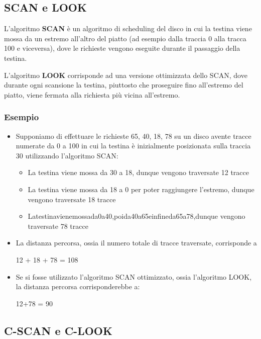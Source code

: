 \documentclass{article}
\begin{document}
\subsection{SCAN e LOOK}
L'algoritmo \textbf{SCAN} è un algoritmo di scheduling del disco in cui la testina viene mossa da un estremo all'altro del piatto (ad esempio dalla traccia 0 alla tracca 100 e viceversa), dove le richieste vengono eseguite durante il passaggio della testina.\par
L'algoritmo \textbf{LOOK} corrisponde ad una versione ottimizzata dello SCAN, dove durante ogni scansione la testina, piuttosto che proseguire fino all'estremo del piatto, viene fermata alla richiesta più vicina all'estremo.

\subsubsection{Esempio}
\begin{itemize}
    \item Supponiamo di effettuare le richieste 65, 40, 18, 78 su un disco avente tracce numerate da 0 a 100 in cui la testina è inizialmente posizionata sulla traccia 30 utilizzando l'algoritmo SCAN:
    \begin{itemize}
        \item La testina viene mossa da 30 a 18, dunque vengono traversate 12 tracce
        \item La testina viene mossa da 18 a 0 per poter raggiungere l'estremo, dunque
        vengono traversate 18 tracce
        \item Latestinavienemossada0a40,poida40a65einfineda65a78,dunque vengono traversate 78 tracce
    \end{itemize}
    \item La distanza percorsa, ossia il numero totale di tracce traversate, corrisponde a
   \begin{center}
    12 + 18 + 78 = 108
   \end{center}
    \item Se si fosse utilizzato l'algoritmo SCAN ottimizzato, ossia l'algoritmo LOOK, la distanza percorsa corrisponderebbe a:
    \begin{center}
        12+78 = 90
    \end{center}
\end{itemize}


\subsection{C-SCAN e C-LOOK}
\end{document}
